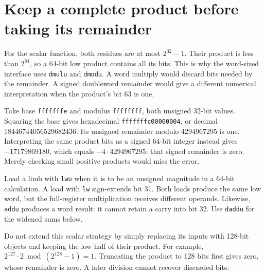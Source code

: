 \section{Keep a complete product before taking its remainder}
For the scalar function, both residues are at most \(2^{32}-1\). Their product is
less than \(2^{64}\), so a 64-bit low product contains all its bits. This is why the
word-sized interface uses \texttt{dmulu} and \texttt{dmodu}. A word multiply would
discard bits needed by the remainder. A signed doubleword remainder would give a
different numerical interpretation when the product's bit 63 is one.

Take base \texttt{fffffffe} and modulus \texttt{ffffffff}, both unsigned 32-bit
values. Squaring the base gives hexadecimal \texttt{fffffffc00000004}, or decimal
18446744056529682436. Its unsigned remainder modulo 4294967295 is one. Interpreting
the same product bits as a signed 64-bit integer instead gives \(-17179869180\),
which equals \(-4\cdot4294967295\); that signed remainder is zero. Merely checking
small positive products would miss the error.

Load a limb with \texttt{lwu} when it is to be an unsigned magnitude in a 64-bit
calculation. A load with \texttt{lw} sign-extends bit 31. Both loads produce the same
low word, but the full-register multiplication receives different operands. Likewise,
\texttt{addu} produces a word result: it cannot retain a carry into bit 32. Use
\texttt{daddu} for the widened sums below.

Do not extend this scalar strategy by simply replacing its inputs with 128-bit
objects and keeping the low half of their product. For example,
\(2^{127}\cdot2\bmod(2^{128}-1)=1\). Truncating the product to 128 bits first gives
zero, whose remainder is zero. A later division cannot recover discarded bits.
